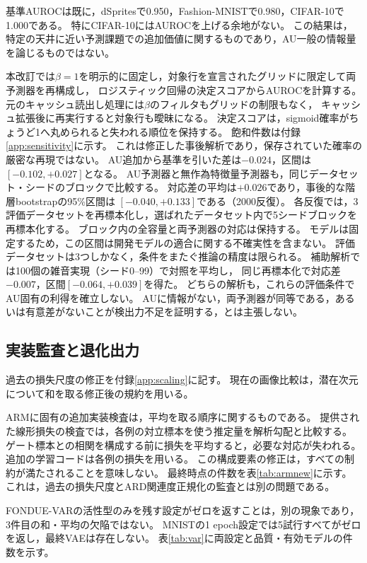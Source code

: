 \documentclass[11pt,a4paper]{ltjsarticle}
\begin{document}
基準AUROCは既に，dSpritesで0.950，Fashion-MNISTで0.980，CIFAR-10で1.000である。
特にCIFAR-10にはAUROCを上げる余地がない。
この結果は，特定の天井に近い予測課題での追加価値に関するものであり，AU一般の情報量を論じるものではない。

本改訂では$\beta=1$を明示的に固定し，対象行を宣言されたグリッドに限定して両予測器を再構成し，
ロジスティック回帰の決定スコアからAUROCを計算する。
元のキャッシュ読出し処理には$\beta$のフィルタもグリッドの制限もなく，
キャッシュ拡張後に再実行すると対象行も曖昧になる。
決定スコアは，sigmoid確率がちょうど1へ丸められると失われる順位を保持する。
飽和件数は付録\ref{app:sensitivity}に示す。
これは修正した事後解析であり，保存されていた確率の厳密な再現ではない。
AU追加から基準を引いた差は$-0.024$，区間は$[-0.102,+0.027]$となる。
AU予測器と無作為特徴量予測器も，同じデータセット・シードのブロックで比較する。
対応差の平均は$+0.026$であり，事後的な階層bootstrapの95\%区間は
$[-0.040,+0.133]$である（2000反復）。
各反復では，3評価データセットを再標本化し，選ばれたデータセット内で5シードブロックを再標本化する。
ブロック内の全容量と両予測器の対応は保持する。
モデルは固定するため，この区間は開発モデルの適合に関する不確実性を含まない。
評価データセットは3つしかなく，条件をまたぐ推論の精度は限られる。
補助解析では100個の雑音実現（シード0--99）で対照を平均し，
同じ再標本化で対応差$-0.007$，区間$[-0.064,+0.039]$を得た。
どちらの解析も，これらの評価条件でAU固有の利得を確立しない。
AUに情報がない，両予測器が同等である，あるいは有意差がないことが検出力不足を証明する，とは主張しない。

\subsection{実装監査と退化出力}
過去の損失尺度の修正を付録\ref{app:scaling}に記す。
現在の画像比較は，潜在次元について和を取る修正後の規約を用いる。

ARMに固有の追加実装検査は，平均を取る順序に関するものである。
提供された線形損失の検査では，各例の対立標本を使う推定量を解析勾配と比較する。
ゲート標本との相関を構成する前に損失を平均すると，必要な対応が失われる。
追加の学習コードは各例の損失を用いる。
この構成要素の修正は，すべての制約が満たされることを意味しない。
最終時点の件数を表\ref{tab:armnew}に示す。
これは，過去の損失尺度とARD関連度正規化の監査とは別の問題である。

FONDUE-VARの活性型のみを残す設定がゼロを返すことは，別の現象であり，3件目の和・平均の欠陥ではない。
MNISTの1 epoch設定では5試行すべてがゼロを返し，最終VAEは存在しない。
表\ref{tab:var}に両設定と品質・有効モデルの件数を示す。
\end{document}
